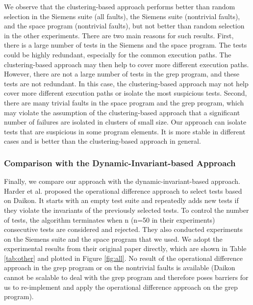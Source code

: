 \documentclass{sig-alternate}
\begin{document}
We observe that the clustering-based approach performs better than
random selection in the Siemens suite (all faults), the Siemens
suite (nontrivial faults), and the space program (nontrivial
faults), but not better than random selection in the other
experiments. There are two main reasons for such results. First,
there is a large number of tests in the Siemens and the space
program. The tests could be highly redundant, especially for the
common execution paths. The clustering-based approach may then help
to cover more different execution paths. However, there are not a
large number of tests in the grep program, and these tests are not
redundant. In this case, the clustering-based approach may not help
cover more different execution paths or isolate the most suspicious
tests. Second, there are many trivial faults in the space program
and the grep program, which may violate the assumption of the
clustering-based approach that a significant number of failures are
isolated in clusters of small size. Our approach can isolate tests
that are suspicious in some program elements. It is more stable in
different cases and is better than the clustering-based approach in
general.



\subsubsection{Comparison with the Dynamic-Invariant-based Approach}

Finally, we compare our approach with the dynamic-invariant-based
approach. Harder et al. \cite{Harder03} proposed the operational
difference approach to select tests based on Daikon. It starts with
an empty test suite and repeatedly adds new tests if they violate
the invariants of the previously selected tests. To control the
number of tests, the algorithm terminates when n (n=50 in their
experiments) consecutive tests are considered and rejected. They
also conducted experiments on the Siemens suite and the space
program that we used. We adopt the experimental results from their
original paper directly, which are shown in Table \ref{tab:other}
and plotted in Figure \ref{fig:all}. No result of the operational
difference approach in the grep program or on the nontrivial faults
is available (Daikon cannot be scalable to deal with the grep
program and therefore poses barriers for us to re-implement and
apply the operational difference approach on the grep program).
\end{document}
